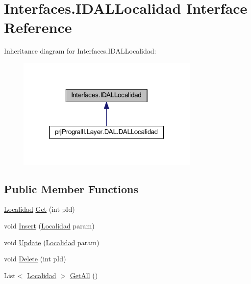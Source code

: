 \hypertarget{interface_interfaces_1_1_i_d_a_l_localidad}{}\section{Interfaces.\+I\+D\+A\+L\+Localidad Interface Reference}
\label{interface_interfaces_1_1_i_d_a_l_localidad}


Inheritance diagram for Interfaces.\+I\+D\+A\+L\+Localidad\+:
\nopagebreak
\begin{figure}[H]
\begin{center}
\leavevmode
\includegraphics[width=254pt]{interface_interfaces_1_1_i_d_a_l_localidad__inherit__graph}
\end{center}
\end{figure}
\subsection*{Public Member Functions}
\begin{DoxyCompactItemize}
\item 
\hyperlink{classprj_progra_i_i_i_1_1_layer_1_1_entities_1_1_localidad}{Localidad} \hyperlink{interface_interfaces_1_1_i_d_a_l_localidad_afc7b2ff5ab6188af4b0c9c1f77961a6c}{Get} (int p\+Id)
\item 
void \hyperlink{interface_interfaces_1_1_i_d_a_l_localidad_a777e6b126a740cc546824c33af5ebd99}{Insert} (\hyperlink{classprj_progra_i_i_i_1_1_layer_1_1_entities_1_1_localidad}{Localidad} param)
\item 
void \hyperlink{interface_interfaces_1_1_i_d_a_l_localidad_a42a1b56da7dcc40c2843e0ecd2287347}{Update} (\hyperlink{classprj_progra_i_i_i_1_1_layer_1_1_entities_1_1_localidad}{Localidad} param)
\item 
void \hyperlink{interface_interfaces_1_1_i_d_a_l_localidad_ad010ce72d666cd1a2f7493b0c75c4b66}{Delete} (int p\+Id)
\item 
List$<$ \hyperlink{classprj_progra_i_i_i_1_1_layer_1_1_entities_1_1_localidad}{Localidad} $>$ \hyperlink{interface_interfaces_1_1_i_d_a_l_localidad_ab0985713e92391e4d781cf8bcf3eba45}{Get\+All} ()
\end{DoxyCompactItemize}


